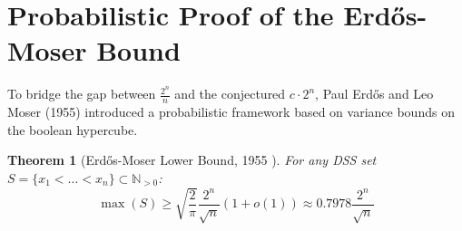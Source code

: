 \documentclass[11pt,a4paper]{article}
\newtheorem{theorem}{Theorem}[section]
\theoremstyle{definition}
\begin{document}
\section{Probabilistic Proof of the Erd\H{o}s-Moser Bound}

To bridge the gap between $\frac{2^n}{n}$ and the conjectured $c \cdot 2^n$, Paul Erd\H{o}s and Leo Moser (1955) \cite{erdos1955} introduced a probabilistic framework based on variance bounds on the boolean hypercube.

\begin{theorem}[Erd\H{o}s-Moser Lower Bound, 1955 \cite{erdos1955}]\label{thm:erdos_moser}
For any DSS set $S = \{x_1 < \dots < x_n\} \subset \mathbb{N}_{>0}$:
\begin{equation}\label{eq:em_bound}
\max(S) \ge \sqrt{\frac{2}{\pi}} \frac{2^n}{\sqrt{n}} (1 + o(1)) \approx 0.7978 \frac{2^n}{\sqrt{n}}
\end{equation}
\end{theorem}
\end{document}

